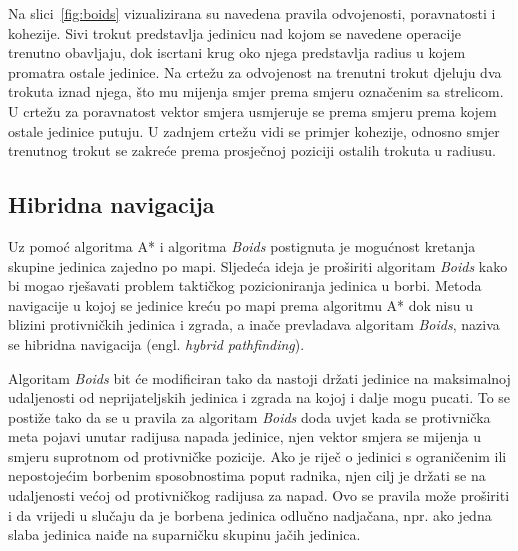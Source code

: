 \documentclass[times, utf8, zavrsni, numeric]{fer}
\begin{document}
\par Na slici~\ref{fig:boids} vizualizirana su navedena pravila odvojenosti, poravnatosti i kohezije. 
Sivi trokut predstavlja jedinicu nad kojom se navedene operacije trenutno obavljaju, dok iscrtani krug oko njega predstavlja radius u kojem promatra ostale jedinice. 
Na crtežu za odvojenost na trenutni trokut djeluju dva trokuta iznad njega, što mu mijenja smjer prema smjeru označenim sa strelicom. 
U crtežu za poravnatost vektor smjera usmjeruje se prema smjeru prema kojem ostale jedinice putuju. 
U zadnjem crtežu vidi se primjer kohezije, odnosno smjer trenutnog trokut se zakreće prema prosječnoj poziciji ostalih trokuta u radiusu.

\subsection{Hibridna navigacija}\label{ssec:hybrid}

\par Uz pomoć algoritma A* i algoritma \textit{Boids} postignuta je mogućnost kretanja skupine jedinica zajedno po mapi.
Sljedeća ideja je proširiti algoritam \textit{Boids} kako bi mogao rješavati problem taktičkog pozicioniranja jedinica u borbi.
Metoda navigacije u kojoj se jedinice kreću po mapi prema algoritmu A* dok nisu u blizini protivničkih jedinica i zgrada, a inače prevladava algoritam \textit{Boids}, naziva se hibridna navigacija (engl. \textit{hybrid pathfinding})\cite{article:HybridPathdinding}.

\par Algoritam \textit{Boids} bit će modificiran tako da nastoji držati jedinice na maksimalnoj udaljenosti od neprijateljskih jedinica i zgrada na kojoj i dalje mogu pucati.
To se postiže tako da se u pravila za algoritam \textit{Boids} doda uvjet kada se protivnička meta pojavi unutar radijusa napada jedinice, njen vektor smjera se mijenja u smjeru suprotnom od protivničke pozicije.
Ako je riječ o jedinici s ograničenim ili nepostojećim borbenim sposobnostima poput radnika, njen cilj je držati se na udaljenosti većoj od protivničkog radijusa za napad.
Ovo se pravila može proširiti i da vrijedi u slučaju da je borbena jedinica odlučno nadjačana, npr. ako jedna slaba jedinica naiđe na suparničku skupinu jačih jedinica.
\end{document}
